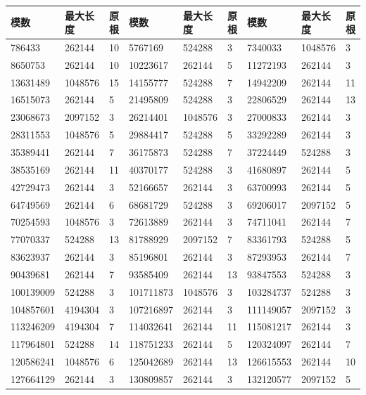 \documentclass{article}
\begin{document}
\begin{longtable}{|l|l|l||l|l|l||l|l|l|}
\hline
模数 & 最大长度 & 原根 & 模数 & 最大长度 & 原根 & 模数 & 最大长度 & 原根 \\
\hline
786433 & 262144 & 10 & 5767169 & 524288 & 3 & 7340033 & 1048576 & 3 \\
\hline
8650753 & 262144 & 10 & 10223617 & 262144 & 5 & 11272193 & 262144 & 3 \\
\hline
13631489 & 1048576 & 15 & 14155777 & 524288 & 7 & 14942209 & 262144 & 11 \\
\hline
16515073 & 262144 & 5 & 21495809 & 524288 & 3 & 22806529 & 262144 & 13 \\
\hline
23068673 & 2097152 & 3 & 26214401 & 1048576 & 3 & 27000833 & 262144 & 3 \\
\hline
28311553 & 1048576 & 5 & 29884417 & 524288 & 5 & 33292289 & 262144 & 3 \\
\hline
35389441 & 262144 & 7 & 36175873 & 524288 & 7 & 37224449 & 524288 & 3 \\
\hline
38535169 & 262144 & 11 & 40370177 & 524288 & 3 & 41680897 & 262144 & 5 \\
\hline
42729473 & 262144 & 3 & 52166657 & 262144 & 3 & 63700993 & 262144 & 5 \\
\hline
64749569 & 262144 & 6 & 68681729 & 524288 & 3 & 69206017 & 2097152 & 5 \\
\hline
70254593 & 1048576 & 3 & 72613889 & 262144 & 3 & 74711041 & 262144 & 7 \\
\hline
77070337 & 524288 & 13 & 81788929 & 2097152 & 7 & 83361793 & 524288 & 5 \\
\hline
83623937 & 262144 & 3 & 85196801 & 262144 & 3 & 87293953 & 262144 & 7 \\
\hline
90439681 & 262144 & 7 & 93585409 & 262144 & 13 & 93847553 & 524288 & 3 \\
\hline
100139009 & 524288 & 3 & 101711873 & 1048576 & 3 & 103284737 & 524288 & 3 \\
\hline
104857601 & 4194304 & 3 & 107216897 & 262144 & 3 & 111149057 & 2097152 & 3 \\
\hline
113246209 & 4194304 & 7 & 114032641 & 262144 & 11 & 115081217 & 262144 & 3 \\
\hline
117964801 & 524288 & 14 & 118751233 & 262144 & 5 & 120324097 & 262144 & 7 \\
\hline
120586241 & 1048576 & 6 & 125042689 & 262144 & 13 & 126615553 & 262144 & 10 \\
\hline
127664129 & 262144 & 3 & 130809857 & 262144 & 3 & 132120577 & 2097152 & 5 \\

\end{longtable}
\end{document}
